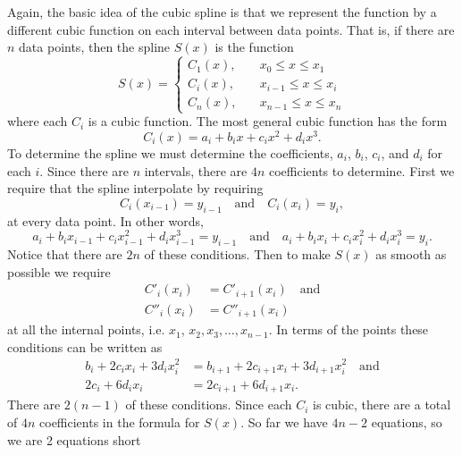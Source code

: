 Again, the basic idea of the cubic spline is that we represent
the function by a different cubic function on each interval
between data points. That is, if there are $n$ data points, then
the spline $S(x)$ is the function
\begin{equation*}
S(x) = \left\{ \begin{array}{ll}
               C_1(x),    & \quad x_0 \le x \le x_1 \\
               C_i(x),    & \quad x_{i-1} \le x \le x_i \\
               C_n(x), & \quad x_{n-1} \le x \le x_n
               \end{array} \right.
\end{equation*}
where each $C_i$ is a cubic function. The most general cubic
function has the form
$$
    C_i(x) = a_i + b_i x + c_i x^2 + d_i x^3.
$$
To determine the spline we must determine the coefficients, $a_i$,
$b_i$, $c_i$, and $d_i$ for each $i$. Since there are $n$ intervals,
there are $4n$ coefficients to determine.
First we require that the spline interpolate by requiring
\begin{equation*}
C_i(x_{i-1}) = y_{i-1}  \quad \text{and} \quad C_i(x_i) = y_i,
\end{equation*}
at every data point. In other words,
$$
a_i + b_i x_{i-1} + c_i x_{i-1}^2 + d_i x_{i-1}^3 = y_{i-1} \quad \text{and} \quad
a_i + b_i x_i + c_i x_i^2 + d_i x_i^3 = y_i.
$$
Notice that there are $2n$ of these conditions. Then to make $S(x)$ as
smooth as possible we require
\begin{equation*}
\begin{split}
C'_i(x_i) &= C'_{i+1}(x_i)\quad\text{and} \\
C''_i(x_i) &= C''_{i+1}(x_i)
\end{split}
\end{equation*}
at all the internal points, i.e. $x_1$, $x_2, x_3, \ldots, x_{n-1}$.
In terms of the points these conditions can be written as
\begin{equation*}
\begin{split}
b_i + 2 c_i x_i + 3 d_i x_i^2
               &= b_{i+1} + 2 c_{i+1} x_i + 3 d_{i+1} x_i^2 \quad\text{and}\\
 2 c_i  + 6 d_i x_i
               &= 2 c_{i+1}  + 6 d_{i+1} x_i.
\end{split}
\end{equation*}
There are $2(n-1)$ of these conditions. Since each $C_i$ is
cubic, there are a total of $4n$ coefficients in the formula
for $S(x)$. So far we have $4n - 2$ equations, so we are 2 equations short
